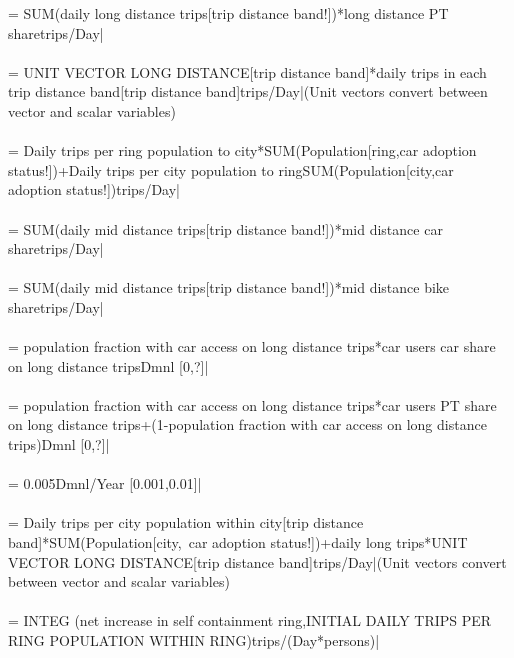  = {\small SUM(daily long distance trips[trip distance band!])*long distance PT sharetrips/Day|} \\ \\ 
 = {\small UNIT VECTOR LONG DISTANCE[trip distance band]*daily trips in each trip distance band[trip distance band]trips/Day|}{\small  (Unit vectors convert between vector and scalar variables)} \\ \\ 
 = {\small Daily trips per ring population to city*SUM(Population[ring,car adoption status!])+Daily trips per city population to ring\*SUM(Population[city,car adoption status!])trips/Day|} \\ \\ 
 = {\small SUM(daily mid distance trips[trip distance band!])*mid distance car sharetrips/Day|} \\ \\ 
 = {\small SUM(daily mid distance trips[trip distance band!])*mid distance bike sharetrips/Day|} \\ \\ 
 = {\small population fraction with car access on long distance trips*car users car share on long distance tripsDmnl [0,?]|} \\ \\ 
 = {\small population fraction with car access on long distance trips*car users PT share on long distance trips+(1-population fraction with car access on long distance trips)Dmnl [0,?]|} \\ \\ 
 = {\small 0.005Dmnl/Year [0.001,0.01]|} \\ \\ 
 = {\small Daily trips per city population within city[trip distance band]*SUM(Population[city,\ car adoption status!])+daily long trips*UNIT VECTOR LONG DISTANCE[trip distance band]trips/Day|}{\small  (Unit vectors convert between vector and scalar variables)} \\ \\ 
 = {\small  INTEG (net increase in self containment ring,INITIAL DAILY TRIPS PER RING POPULATION WITHIN RING)trips/(Day*persons)|} \\ \\ 
